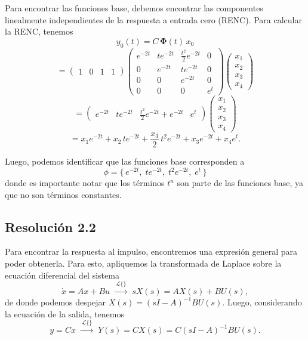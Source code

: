 \documentclass[
  11pt,
  letterpaper,
   addpoints,
   answers
  ]{exam}
\begin{document}
\begin{questions}
\begin{solution}
Para encontrar las funciones base, debemos encontrar las componentes linealmente independientes de la respuesta a entrada cero (RENC). Para calcular la RENC, tenemos
\begin{equation}
y_{0}(t)=C\,\bm{\Phi}(t)\,x_{0}
\end{equation}
\begin{equation}
=\begin{pmatrix}1 & 0 & 1 & 1\end{pmatrix}
\begin{pmatrix}
e^{-2t} & t e^{-2t} & \tfrac{t^{2}}{2} e^{-2t} & 0\\
0 & e^{-2t} & t e^{-2t} & 0\\
0 & 0 & e^{-2t} & 0\\
0 & 0 & 0 & e^{t}
\end{pmatrix}
\begin{pmatrix}x_{1}\\ x_{2}\\ x_{3}\\ x_{4}\end{pmatrix}
\end{equation}
\begin{equation}
=\begin{pmatrix}
e^{-2t} & t e^{-2t} & \tfrac{t^{2}}{2} e^{-2t}+e^{-2t} & e^{t}
\end{pmatrix}
\begin{pmatrix}x_{1}\\ x_{2}\\ x_{3}\\ x_{4}\end{pmatrix}
\end{equation}
\begin{equation}
= x_{1}e^{-2t} + x_{2}\,t e^{-2t} + \frac{x_{3}}{2}\, t^{2} e^{-2t} + x_{3} e^{-2t} + x_{4} e^{t}.
\end{equation}

Luego, podemos identificar que las funciones base corresponden a
\begin{equation}
\boxed{\;\phi=\{\,e^{-2t},\; t e^{-2t},\; t^{2} e^{-2t},\; e^{t}\,\}\;}
\end{equation}
donde es importante notar que los términos $t^{n}$ son parte de las funciones base, ya que no son términos constantes.
\subsection*{Resolución 2.2}

Para encontrar la respuesta al impulso, encontremos una expresión general para poder obtenerla.
Para esto, apliquemos la transformada de Laplace sobre la ecuación diferencial del sistema
\setcounter{equation}{15}
\begin{equation}
\dot{x}=Ax+Bu
\;\xrightarrow{\ \mathcal{L}\{\}\ }\;
sX(s)=AX(s)+BU(s),
\end{equation}
de donde podemos despejar $X(s)=(sI-A)^{-1}BU(s)$. Luego, considerando la ecuación de la salida, tenemos
\begin{equation}
y=Cx
\;\xrightarrow{\ \mathcal{L}\{\}\ }\;
Y(s)=CX(s)=C(sI-A)^{-1}BU(s).
\end{equation}


\end{solution}
\end{questions}
\end{document}
